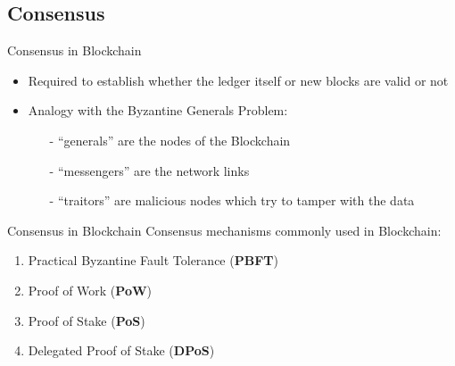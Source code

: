\documentclass{beamer}
\begin{document}
  \subsection{Consensus}
  \begin{frame}{Consensus in Blockchain}
      \begin{itemize}
        \item Required to establish whether the ledger itself or new blocks are
        valid or not
        \item Analogy with the Byzantine Generals Problem:
        \begin{itemize}
            \item[-]``generals'' are the nodes of the Blockchain
            \item[-]``messengers'' are the network links
            \item[-]``traitors'' are malicious nodes which try to tamper with the data
        \end{itemize} 
      \end{itemize}
  \end{frame}
  
  
  
  \begin{frame}{Consensus in Blockchain}
      Consensus mechanisms commonly used in Blockchain:
      \begin{enumerate}
        \item Practical Byzantine Fault Tolerance (\textbf{PBFT})
        \item Proof of Work (\textbf{PoW})
        \item Proof of Stake (\textbf{PoS})
        \item Delegated Proof of Stake (\textbf{DPoS})
      \end{enumerate}
  \end{frame}
\end{document}

